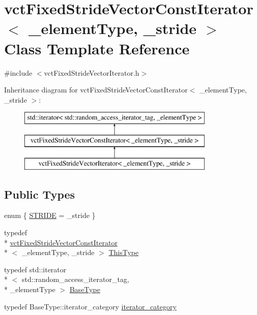 \hypertarget{classvct_fixed_stride_vector_const_iterator}{\section{vct\-Fixed\-Stride\-Vector\-Const\-Iterator$<$ \-\_\-element\-Type, \-\_\-stride $>$ Class Template Reference}
\label{classvct_fixed_stride_vector_const_iterator}
}


{\ttfamily \#include $<$vct\-Fixed\-Stride\-Vector\-Iterator.\-h$>$}

Inheritance diagram for vct\-Fixed\-Stride\-Vector\-Const\-Iterator$<$ \-\_\-element\-Type, \-\_\-stride $>$\-:\begin{figure}[H]
\begin{center}
\leavevmode
\includegraphics[height=3.000000cm]{d4/d1e/classvct_fixed_stride_vector_const_iterator}
\end{center}
\end{figure}
\subsection*{Public Types}
\begin{DoxyCompactItemize}
\item 
enum \{ \hyperlink{classvct_fixed_stride_vector_const_iterator_ad9c45d45b581c90996fb9064a14df79ca94922a822d949144352b904c2a75564d}{S\-T\-R\-I\-D\-E} = \-\_\-stride
 \}
\item 
typedef \\*
\hyperlink{classvct_fixed_stride_vector_const_iterator}{vct\-Fixed\-Stride\-Vector\-Const\-Iterator}\\*
$<$ \-\_\-element\-Type, \-\_\-stride $>$ \hyperlink{classvct_fixed_stride_vector_const_iterator_ac60fc9d8c2af56a7f251d9a7040efa1e}{This\-Type}
\item 
typedef std\-::iterator\\*
$<$ std\-::random\-\_\-access\-\_\-iterator\-\_\-tag, \\*
\-\_\-element\-Type $>$ \hyperlink{classvct_fixed_stride_vector_const_iterator_ad92100e30e7cbc86c778a0a01a1d19e5}{Base\-Type}
\item 
typedef Base\-Type\-::iterator\-\_\-category \hyperlink{classvct_fixed_stride_vector_const_iterator_adda9caa49222d747d94b783c74fb95eb}{iterator\-\_\-category}
\end{DoxyCompactItemize}
